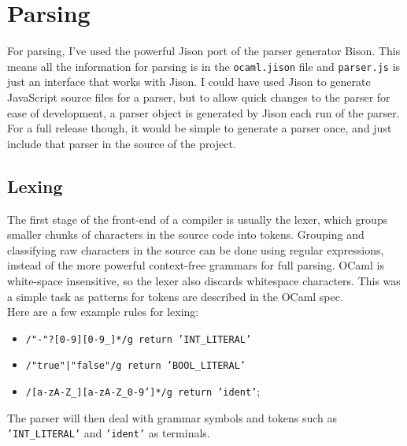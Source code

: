 \documentclass[12pt,a4paper,twoside,openright]{report}
\begin{document}
\section{Parsing}
For parsing, I've used the powerful Jison port of the parser generator Bison.
This means all the information for parsing is in the {\tt ocaml.jison} file and {\tt parser.js} is just an interface that works with Jison.
I could have used Jison to generate JavaScript source files for a parser, but to allow quick changes to the parser for ease of development, a parser object is generated by Jison each run of the parser.
For a full release though, it would be simple to generate a parser once, and just include that parser in the source of the project.

\subsection{Lexing}
The first stage of the front-end of a compiler is usually the lexer, which groups smaller chunks of characters in the source code into tokens.
Grouping and classifying raw characters in the source can be done using regular expressions, instead of the more powerful context-free grammars for full parsing.
OCaml is white-space insensitive, so the lexer also discards whitespace characters.
This was a simple task as patterns for tokens are described in the OCaml spec. \\
Here are a few example rules for lexing:
\begin{itemize}
   \item {\tt /"-"?[0-9][0-9\_]*/g return 'INT\_LITERAL'}
   \item {\tt /"true"|"false"/g return 'BOOL\_LITERAL'}
   \item {\tt /[a-zA-Z\_][a-zA-Z\_0-9']*/g return 'ident'};
\end{itemize}
The parser will then deal with grammar symbols and tokens such as {\tt 'INT\_LITERAL'} and {\tt 'ident'} as terminals.
\end{document}
